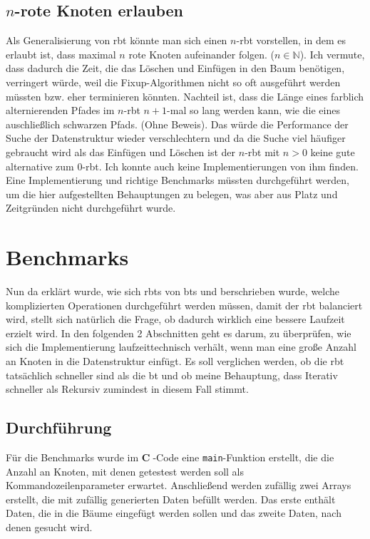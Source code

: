 \documentclass[11pt]{article}
\newcommand{\lstin}[1]{\lstinline[language=C]{#1}}
\newcommand{\cpl}{\textbf{C}$\;$}
\begin{document}
\subsection{$n$-rote Knoten erlauben}
Als Generalisierung von \gls{rbt} könnte man sich einen $n$-\gls{rbt} vorstellen, in dem es erlaubt ist, dass maximal $n$ rote Knoten aufeinander folgen. ($n \in \mathbb{N}$). 
Ich vermute, dass dadurch die Zeit, die das Löschen und Einfügen in den Baum benötigen, verringert würde, weil die Fixup-Algorithmen nicht so oft ausgeführt werden müssten bzw. eher terminieren könnten.\cite[S. 301]{btrees}
Nachteil ist, dass die Länge eines farblich alternierenden Pfades im $n$-\gls{rbt} $n+1$-mal so lang werden kann, wie die eines auschließlich schwarzen Pfads. (Ohne Beweis).
Das würde die Performance der Suche der Datenstruktur wieder verschlechtern und da die Suche viel häufiger gebraucht wird als das Einfügen und Löschen ist der $n$-\gls{rbt} mit $n > 0$
keine gute alternative zum $0$-\gls{rbt}. Ich konnte auch keine Implementierungen von ihm finden.
Eine Implementierung und richtige Benchmarks müssten durchgeführt werden, um die hier aufgestellten Behauptungen zu belegen, was aber aus Platz und Zeitgründen nicht durchgeführt wurde. 

\pagebreak
\section{Benchmarks}

Nun da erklärt wurde, wie sich \glspl{rbt} von \glspl{bt} und berschrieben wurde, welche komplizierten Operationen durchgeführt werden müssen, damit der \gls{rbt} balanciert wird,
stellt sich natürlich die Frage, ob dadurch wirklich eine bessere Laufzeit erzielt wird.
In den folgenden 2 Abschnitten geht es darum, zu überprüfen, wie sich die Implementierung laufzeittechnisch verhält, wenn man eine große Anzahl an Knoten in die Datenstruktur einfügt.
Es soll verglichen werden, ob die \gls{rbt} tatsächlich schneller sind als die \gls{bt} und ob meine Behauptung, dass Iterativ schneller als Rekursiv zumindest in diesem Fall stimmt. 

\subsection{Durchführung}
Für die Benchmarks wurde im \cpl-Code eine \lstin{main}-Funktion erstellt, die die Anzahl an Knoten, mit denen getestest werden soll als Kommandozeilenparameter erwartet.
Anschließend werden zufällig zwei Arrays erstellt, die mit zufällig generierten Daten befüllt werden. Das erste enthält Daten, die in die Bäume eingefügt werden sollen und das zweite Daten, nach denen gesucht wird.
\end{document}
